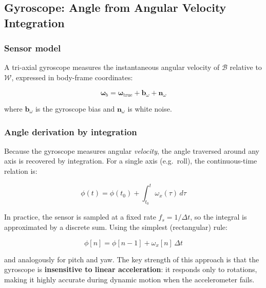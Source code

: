 \subsection{Gyroscope: Angle from Angular Velocity Integration}
\label{sec:frames:gyro}

\subsubsection{Sensor model}

A tri-axial gyroscope measures the instantaneous angular velocity of
$\mathcal{B}$ relative to $\mathcal{W}$, expressed in body-frame coordinates:

\begin{equation}
  \boldsymbol{\omega}_b = \boldsymbol{\omega}_\text{true}
                        + \mathbf{b}_\omega + \mathbf{n}_\omega
  \label{eq:gyro_model}
\end{equation}

\noindent where $\mathbf{b}_\omega$ is the gyroscope bias and
$\mathbf{n}_\omega$ is white noise.

\subsubsection{Angle derivation by integration}

Because the gyroscope measures angular \emph{velocity}, the angle traversed
around any axis is recovered by integration. For a single axis (e.g.\ roll),
the continuous-time relation is:

\begin{equation}
  \phi(t) = \phi(t_0) + \int_{t_0}^{t} \omega_x(\tau)\,d\tau
  \label{eq:gyro_angle_continuous}
\end{equation}

In practice, the sensor is sampled at a fixed rate $f_s = 1/\Delta t$, so the
integral is approximated by a discrete sum. Using the simplest (rectangular)
rule:

\begin{equation}
  \phi[n] = \phi[n-1] + \omega_x[n]\,\Delta t
  \label{eq:gyro_angle_discrete}
\end{equation}

\noindent and analogously for pitch and yaw. The key strength of this approach
is that the gyroscope is \textbf{insensitive to linear acceleration}: it
responds only to rotations, making it highly accurate during dynamic motion
when the accelerometer fails.

